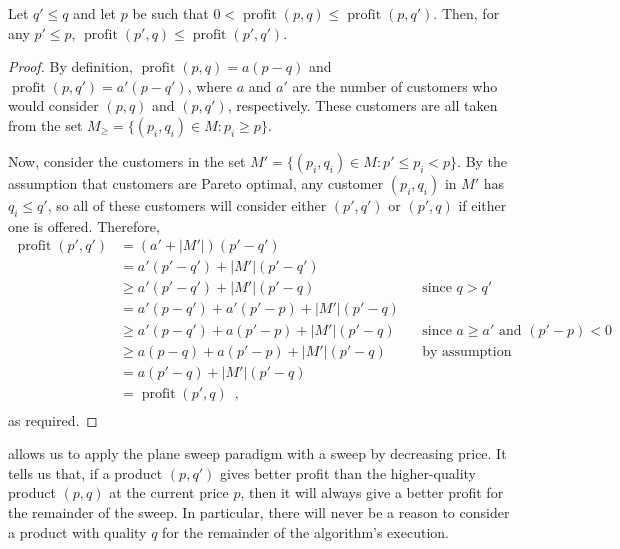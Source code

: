 \documentclass[lotsofwhite]{patmorin}
\newcommand{\val}{\operatorname{profit}}
\begin{document}
\begin{lem}
  Let $q' \le q$ and let $p$ be such that $0 < \val(p,q) \le \val(p,q')$.
  Then, for any $p' \le p$, $\val(p',q) \le \val(p',q')$.
\end{lem}

\begin{proof}
  By definition, $\val(p,q) = a(p-q)$ and $\val(p,q') = a'(p-q')$, where
  $a$ and $a'$ are the number of customers who would consider $(p,q)$
  and $(p,q')$, respectively.  These customers are all taken from the
  set $M_\ge =\{(p_i,q_i)\in M: p_i \ge p\}$.

  Now, consider the customers in the set $M'=\{(p_i,q_i)\in M: p' \le
  p_i < p\}$.  By the assumption that customers are Pareto optimal,
  any customer $(p_i,q_i)$ in $M'$ has $q_i \le q'$, so all of these
  customers will consider either $(p',q')$ or $(p',q)$ if either one
  is offered.  Therefore,
  \[
    \begin{aligned}
      \val(p',q')
        &  =   (a'+|M'|)(p'-q') \\
        &  =   a'(p'-q') + |M'|(p'-q') \\
        & \ge  a'(p'-q') + |M'|(p'-q) 
               && \mbox{since $q > q'$} \\
        &  =   a'(p-q') + a'(p'-p) + |M'|(p'-q) \\
        & \ge  a'(p-q') + a(p'-p) + |M'|(p'-q) 
               && \mbox{since $a \ge a'$ and $(p'-p) < 0$} \\
        & \ge  a(p-q) + a(p'-p) + |M'|(p'-q) 
               && \mbox{by assumption} \\
        &  =  a(p'-q) + |M'|(p'-q) \\
        &  =  \val(p',q) \enspace , \\
    \end{aligned}
  \]
  as required.
\end{proof}

 allows us to apply the plane sweep paradigm with a sweep
by decreasing price.  It tells us that, if a product $(p,q')$ gives better
profit than the higher-quality product $(p,q)$ at the current price $p$,
then it will always give a better profit for the remainder of the sweep.
In particular, there will never be a reason to consider a product with
quality $q$ for the remainder of the algorithm's execution.
\end{document}
